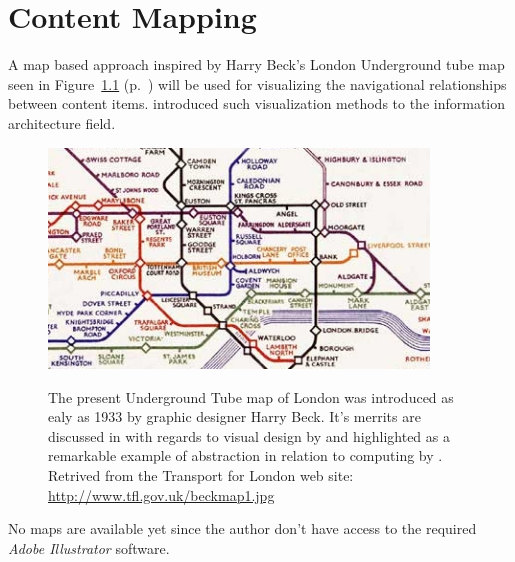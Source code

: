 \chapter{Content Mapping}

\label{appendix:content.mapping}

A map based approach inspired by Harry Beck's London Underground tube
map seen in Figure~\ref{figure:beck.1933.map}
(p.~\pageref{figure:beck.1933.map})
will be used for visualizing the navigational relationships between content
items. \citet{walsh07} introduced such visualization methods to the information
architecture field.

\begin{figure}[h]
  \begin{center}
    \label{figure:beck.1933.map}
    \includegraphics[width=0.9\textwidth]{beck_1933_map}
    \caption[1933 London Underground Tube map]{%
      The present Underground Tube map of London was introduced as ealy as
      1933 by graphic designer Harry Beck. It's merrits are discussed
      in with regards to visual design by \citet{hadlaw03} and highlighted as
      a remarkable example of abstraction in relation to computing by
      \citet{kramer07}. Retrived from the Transport for London web site:
      \url{http://www.tfl.gov.uk/beckmap1.jpg}}
  \end{center}
\end{figure}

No maps are available yet since the author don't have access to the required
\emph{Adobe Illustrator} software.
